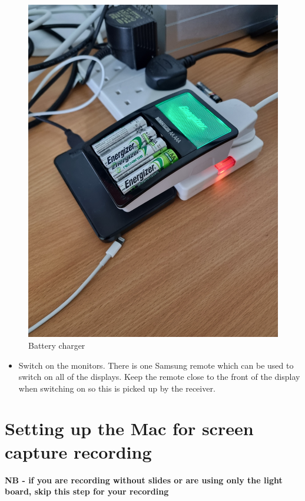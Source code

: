 \documentclass[
]{book}
\providecommand{\tightlist}{%
  \setlength{\itemsep}{0pt}\setlength{\parskip}{0pt}}
\begin{document}
\begin{figure}

{\centering \includegraphics[width=0.6\linewidth]{Charger} 

}

\caption{Battery charger}\label{fig:charger}
\end{figure}

\begin{itemize}
\tightlist
\item
  Switch on the monitors. There is one Samsung remote which can be used to switch on all of the displays. Keep the remote close to the front of the display when switching on so this is picked up by the receiver.
\end{itemize}

\hypertarget{setting-up-the-mac-for-screen-capture-recording}{%
\section{Setting up the Mac for screen capture recording}\label{setting-up-the-mac-for-screen-capture-recording}}

\textbf{NB - if you are recording without slides or are using only the light board, skip this step for your recording}
\end{document}
